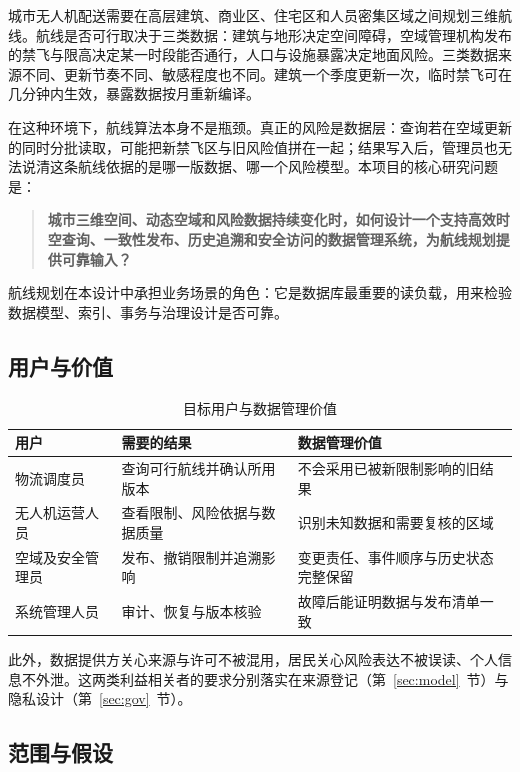 \documentclass[a4paper,11pt,UTF8]{ctexart}
\begin{document}
城市无人机配送需要在高层建筑、商业区、住宅区和人员密集区域之间规划三维航线。航线是否可行取决于三类数据：建筑与地形决定空间障碍，空域管理机构发布的禁飞与限高决定某一时段能否通行，人口与设施暴露决定地面风险。三类数据来源不同、更新节奏不同、敏感程度也不同。建筑一个季度更新一次，临时禁飞可在几分钟内生效，暴露数据按月重新编译。

在这种环境下，航线算法本身不是瓶颈。真正的风险是数据层：查询若在空域更新的同时分批读取，可能把新禁飞区与旧风险值拼在一起；结果写入后，管理员也无法说清这条航线依据的是哪一版数据、哪一个风险模型。本项目的核心研究问题是：

\begin{quote}
\textbf{城市三维空间、动态空域和风险数据持续变化时，如何设计一个支持高效时空查询、一致性发布、历史追溯和安全访问的数据管理系统，为航线规划提供可靠输入？}
\end{quote}

航线规划在本设计中承担业务场景的角色：它是数据库最重要的读负载，用来检验数据模型、索引、事务与治理设计是否可靠。

\subsection{用户与价值}

\begin{table}[!htbp]\centering\small
\caption{目标用户与数据管理价值}
\begin{tabularx}{\textwidth}{L{2.6cm}YY}
\toprule
用户 & 需要的结果 & 数据管理价值 \\
\midrule
物流调度员 & 查询可行航线并确认所用版本 & 不会采用已被新限制影响的旧结果 \\
无人机运营人员 & 查看限制、风险依据与数据质量 & 识别未知数据和需要复核的区域 \\
空域及安全管理员 & 发布、撤销限制并追溯影响 & 变更责任、事件顺序与历史状态完整保留 \\
系统管理人员 & 审计、恢复与版本核验 & 故障后能证明数据与发布清单一致 \\
\bottomrule
\end{tabularx}
\end{table}

此外，数据提供方关心来源与许可不被混用，居民关心风险表达不被误读、个人信息不外泄。这两类利益相关者的要求分别落实在来源登记（第~\ref{sec:model}~节）与隐私设计（第~\ref{sec:gov}~节）。

\subsection{范围与假设}
\end{document}
